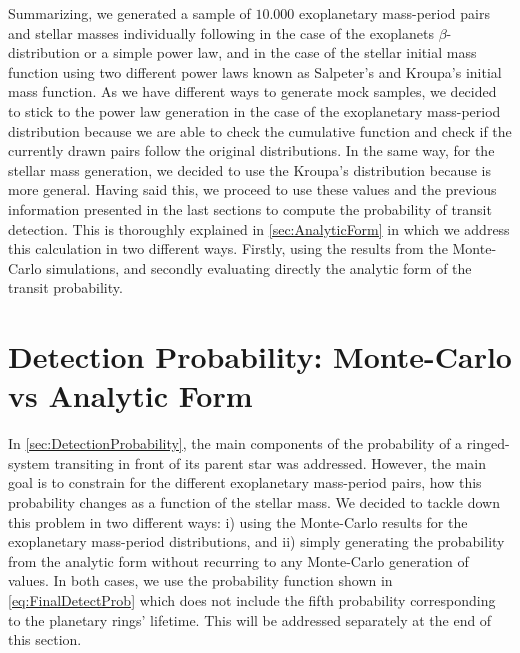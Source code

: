 Summarizing, we generated a sample of $10.000$ exoplanetary mass-period pairs and stellar masses individually following in the case of the exoplanets $\beta$-distribution or a simple power law, and in the case of the stellar initial mass function using two different power laws known as Salpeter's and Kroupa's initial mass function. As we have different ways to generate mock samples, we decided to stick to the power law generation in the case of the exoplanetary mass-period distribution because we are able to check the cumulative function and check if the currently drawn pairs follow the original distributions. In the same way, for the stellar mass generation, we decided to use the Kroupa's distribution because is more general. Having said this, we proceed to use these values and the previous information presented in the last sections to compute the probability of transit detection. This is thoroughly explained in \autoref{sec:AnalyticForm} in which we address this calculation in two different ways. Firstly, using the results from the Monte-Carlo simulations, and secondly evaluating directly the analytic form of the transit probability.     



\section{Detection Probability: Monte-Carlo vs Analytic Form} \label{sec:AnalyticForm}

In \autoref{sec:DetectionProbability}, the main components of the probability of a ringed-system transiting in front of its parent star was addressed. However, the main goal is to constrain for the different exoplanetary mass-period pairs, how this probability changes as a function of the stellar mass. We decided to tackle down this problem in two different ways: i) using the Monte-Carlo results for the exoplanetary mass-period distributions, and ii) simply generating the probability from the analytic form without recurring to any Monte-Carlo generation of values. In both cases, we use the probability function shown in \autoref{eq:FinalDetectProb} which does not include the fifth probability corresponding to the planetary rings' lifetime. This will be addressed separately at the end of this section.\\

